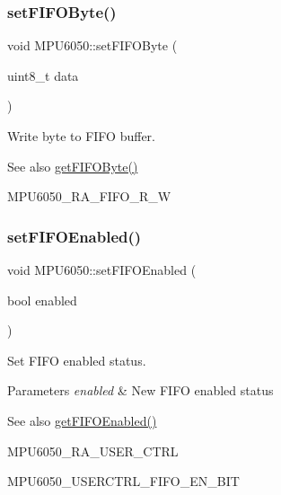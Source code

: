 \subsubsection{\texorpdfstring{setFIFOByte()}{setFIFOByte()}}
{\footnotesize\ttfamily void M\+P\+U6050\+::set\+F\+I\+F\+O\+Byte (\begin{DoxyParamCaption}\item[{uint8\+\_\+t}]{data }\end{DoxyParamCaption})}

Write byte to F\+I\+FO buffer. \begin{DoxySeeAlso}{See also}
\mbox{\hyperlink{class_m_p_u6050_a7733011d30d5b64564f6b5422d8639ae}{get\+F\+I\+F\+O\+Byte()}} 

M\+P\+U6050\+\_\+\+R\+A\+\_\+\+F\+I\+F\+O\+\_\+\+R\+\_\+W 
\end{DoxySeeAlso}
\mbox{\label{class_m_p_u6050_a78e58ab27986db6999af775ed4d43091}} 
\subsubsection{\texorpdfstring{setFIFOEnabled()}{setFIFOEnabled()}}
{\footnotesize\ttfamily void M\+P\+U6050\+::set\+F\+I\+F\+O\+Enabled (\begin{DoxyParamCaption}\item[{bool}]{enabled }\end{DoxyParamCaption})}

Set F\+I\+FO enabled status. 
\begin{DoxyParams}{Parameters}
{\em enabled} & New F\+I\+FO enabled status \\
\hline
\end{DoxyParams}
\begin{DoxySeeAlso}{See also}
\mbox{\hyperlink{class_m_p_u6050_ae2687a09ebe0d7fbbf74f560e0dd9a44}{get\+F\+I\+F\+O\+Enabled()}} 

M\+P\+U6050\+\_\+\+R\+A\+\_\+\+U\+S\+E\+R\+\_\+\+C\+T\+RL 

M\+P\+U6050\+\_\+\+U\+S\+E\+R\+C\+T\+R\+L\+\_\+\+F\+I\+F\+O\+\_\+\+E\+N\+\_\+\+B\+IT 
\end{DoxySeeAlso}
\mbox{\label{class_m_p_u6050_a18dd79b7c53600e9ce97eed4bfe6cf15}} 
